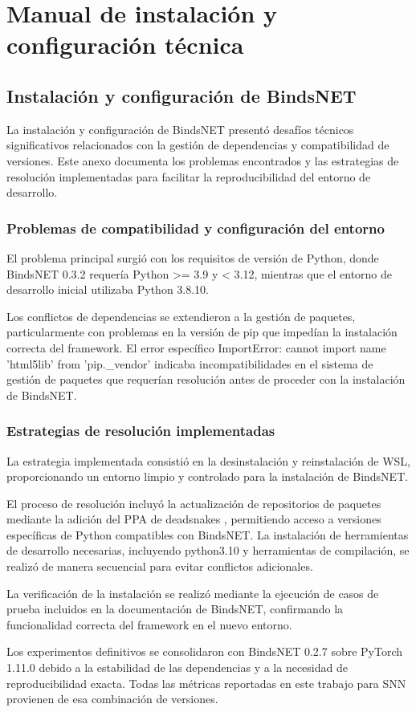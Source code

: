 \chapter{Manual de instalación y configuración técnica}
\label{anexo:manual-instalacion}

\section{Instalación y configuración de BindsNET}

La instalación y configuración de BindsNET presentó desafíos técnicos significativos relacionados con la gestión de dependencias y compatibilidad de versiones. Este anexo documenta los problemas encontrados y las estrategias de resolución implementadas para facilitar la reproducibilidad del entorno de desarrollo.

\subsection{Problemas de compatibilidad y configuración del entorno}

El problema principal surgió con los requisitos de versión de Python, donde BindsNET 0.3.2 requería Python >= 3.9 y < 3.12, mientras que el entorno de desarrollo inicial utilizaba Python 3.8.10.

Los conflictos de dependencias se extendieron a la gestión de paquetes, particularmente con problemas en la versión de pip que impedían la instalación correcta del framework. El error específico ImportError: cannot import name 'html5lib' from 'pip.\_vendor' indicaba incompatibilidades en el sistema de gestión de paquetes que requerían resolución antes de proceder con la instalación de BindsNET.

\subsection{Estrategias de resolución implementadas}

La estrategia implementada consistió en la desinstalación y reinstalación de WSL, proporcionando un entorno limpio y controlado para la instalación de BindsNET.

El proceso de resolución incluyó la actualización de repositorios de paquetes mediante la adición del PPA de deadsnakes \cite{deadsnakes2025}, permitiendo acceso a versiones específicas de Python compatibles con BindsNET. La instalación de herramientas de desarrollo necesarias, incluyendo python3.10 y herramientas de compilación, se realizó de manera secuencial para evitar conflictos adicionales.

La verificación de la instalación se realizó mediante la ejecución de casos de prueba incluidos en la documentación de BindsNET, confirmando la funcionalidad correcta del framework en el nuevo entorno.

Los experimentos definitivos se consolidaron con BindsNET 0.2.7 sobre PyTorch 1.11.0 debido a la estabilidad de las dependencias y a la necesidad de reproducibilidad exacta. Todas las métricas reportadas en este trabajo para SNN provienen de esa combinación de versiones.

